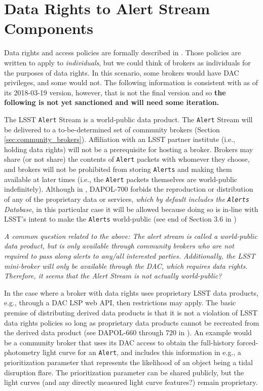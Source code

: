 \section{Data Rights to Alert Stream Components}\label{sec:data_rights}



Data rights and access policies are formally described in . Those policies are written to apply to {\em individuals}, but we could think of brokers as individuals for the purposes of data rights. In this scenario, some brokers would have DAC privileges, and some would not. The following information is consistent with  as of its 2018-03-19 version, however, that is not the final version and so {\bf the following is not yet sanctioned and will need some iteration.}

The LSST {\tt Alert} Stream is a world-public data product. The {\tt Alert} Stream will be delivered to a to-be-determined set of community brokers (Section \ref{sec:community_brokers}). Affiliation with an LSST partner institute (i.e., holding data rights) will not be a prerequisite for hosting a broker. Brokers may share (or not share) the contents of {\tt Alert} packets with whomever they choose, and brokers will not be prohibited from storing {\tt Alerts} and making them available at later times (i.e., the {\tt Alert} packets themselves are world-public indefinitely). Although in , DAPOL-700 forbids the reproduction or distribution of any of the proprietary data or services, {\em which by default includes the {\tt Alerts} Database}, in this particular case it will be allowed because doing so is in-line with LSST's intent to make the {\tt Alerts} world-public (see end of Section 3.6 in )

{\it A common question related to the above: The alert stream is called a world-public data product, but is only available through community brokers who are not required to pass along alerts to any/all interested parties. Additionally, the LSST mini-broker will only be available through the DAC, which requires data rights. Therefore, it seems that the Alert Stream is not actually world-public?}

In the case where a broker with data rights uses proprietary LSST data products, e.g., through a DAC LSP web API, then restrictions may apply. The basic premise of distributing derived data products is that it is not a violation of LSST data rights policies so long as proprietary data products cannot be recreated from the derived data product (see DAPOL-660 through 720 in ). An example would be a community broker that uses its DAC access to obtain the full-history forced-photometry light curve for an {\tt Alert}, and includes this information in e.g., a prioritization parameter that represents the likelihood of an object being a tidal disruption flare. The prioritization parameter can be shared publicly, but the light curves (and any directly measured light curve features?) remain proprietary.

